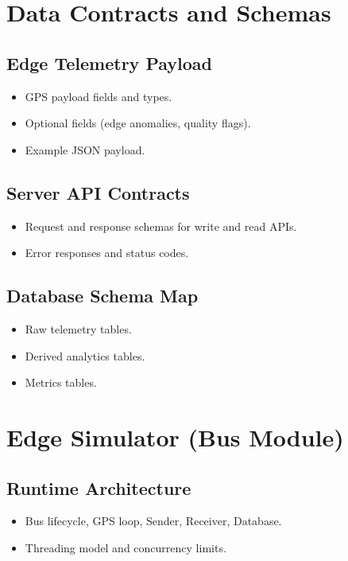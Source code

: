 \documentclass[12pt, a4paper]{article}
\begin{document}
\section{Data Contracts and Schemas}
\subsection{Edge Telemetry Payload}
\begin{itemize}[leftmargin=*]
    \item GPS payload fields and types.
    \item Optional fields (edge anomalies, quality flags).
    \item Example JSON payload.
\end{itemize}

\subsection{Server API Contracts}
\begin{itemize}[leftmargin=*]
    \item Request and response schemas for write and read APIs.
    \item Error responses and status codes.
\end{itemize}

\subsection{Database Schema Map}
\begin{itemize}[leftmargin=*]
    \item Raw telemetry tables.
    \item Derived analytics tables.
    \item Metrics tables.
\end{itemize}

\section{Edge Simulator (Bus Module)}
\subsection{Runtime Architecture}
\begin{itemize}[leftmargin=*]
    \item Bus lifecycle, GPS loop, Sender, Receiver, Database.
    \item Threading model and concurrency limits.
\end{itemize}
\end{document}

